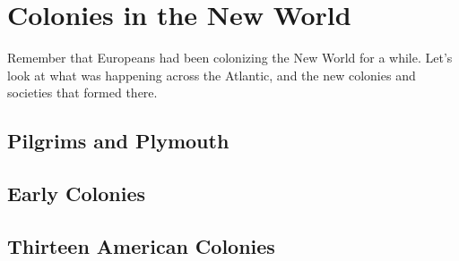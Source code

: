 \chapter{Colonies in the New World}

Remember that Europeans had been colonizing the New World for a while.
Let's look at what was happening across the Atlantic,
and the new colonies and societies that formed there.

\section{Pilgrims and Plymouth}

\section{Early Colonies}

\section{Thirteen American Colonies}
